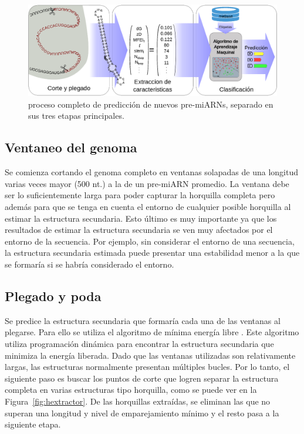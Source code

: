 \begin{figure}[h]
	\centering
	\includegraphics[width=\textwidth]{fig/diagrama.eps}
	\caption[Etapas de la predicción de microARN]{proceso completo de predicción de nuevos pre-miARNs, separado en sus tres etapas principales.}
	\label{fig:esquema}
\end{figure}

\subsection{Ventaneo del genoma}

Se comienza cortando el genoma completo en ventanas solapadas de una longitud varias veces mayor (500 nt.) a la de un pre-miARN promedio. La ventana debe ser
lo suficientemente larga para poder capturar la horquilla completa pero además para que se tenga en cuenta el entorno de cualquier posible horquilla al
estimar la estructura secundaria. Esto último es muy importante ya que los resultados de estimar la estructura secundaria se ven muy afectados por el entorno
de la secuencia. Por ejemplo, sin considerar el entorno de una secuencia, la estructura secundaria estimada puede presentar una estabilidad menor a la que se
formaría si se habría considerado el entorno.

\subsection{Plegado y poda}

Se predice la estructura secundaria que formaría cada una de las ventanas al plegarse. Para ello se utiliza el algoritmo de mínima energía libre
\citep{zuker1981optimal}. Este algoritmo utiliza programación dinámica para encontrar la estructura secundaria que minimiza la energía liberada. Dado que
las ventanas utilizadas son relativamente largas, las estructuras normalmente presentan múltiples bucles. Por lo tanto, el siguiente paso es buscar los puntos
de corte que logren separar la estructura completa en varias estructuras tipo horquilla, como se puede ver en la Figura~\ref{fig:hextractor}. De las horquillas
extraídas, se eliminan las que no superan una longitud y nivel de emparejamiento mínimo y el resto pasa a la siguiente etapa.


